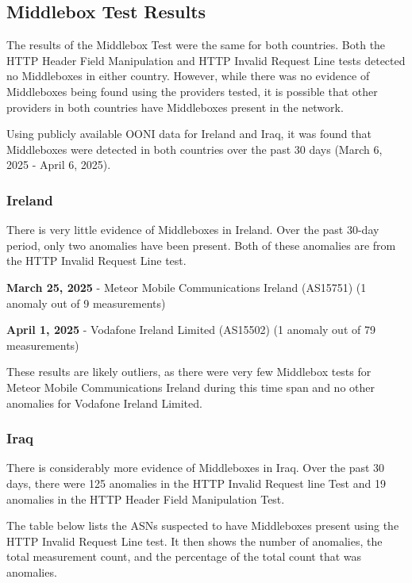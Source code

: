 \subsection{Middlebox Test Results}

The results of the Middlebox Test were the same for both countries. Both the HTTP Header Field Manipulation and HTTP Invalid Request Line tests detected no Middleboxes in either country. However, while there was no evidence of Middleboxes being found using the providers tested, it is possible that other providers in both countries have Middleboxes present in the network.

Using publicly available OONI data for Ireland and Iraq, it was found that Middleboxes were detected in both countries over the past 30 days (March 6, 2025 - April 6, 2025). 

\subsubsection{Ireland}

There is very little evidence of Middleboxes in Ireland. Over the past 30-day period, only two anomalies have been present. Both of these anomalies are from the HTTP Invalid Request Line test. 

\textbf{March 25, 2025} - Meteor Mobile Communications Ireland (AS15751) (1 anomaly out of 9 measurements)

\textbf{April 1, 2025} - Vodafone Ireland Limited (AS15502) (1 anomaly out of 79 measurements)

These results are likely outliers, as there were very few Middlebox tests for Meteor Mobile Communications Ireland during this time span and no other anomalies for Vodafone Ireland Limited.

\subsubsection{Iraq}

There is considerably more evidence of Middleboxes in Iraq. Over the past 30 days, there were 125 anomalies in the HTTP Invalid Request line Test and 19 anomalies in the HTTP Header Field Manipulation Test.

The table below lists the ASNs suspected to have Middleboxes present using the HTTP Invalid Request Line test. It then shows the number of anomalies, the total measurement count, and the percentage of the total count that was anomalies.

